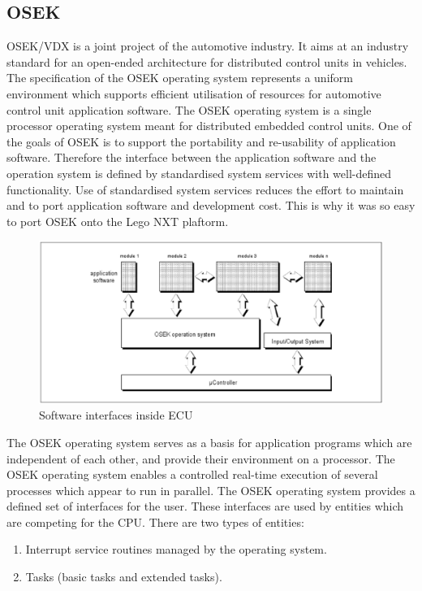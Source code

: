 \subsection{OSEK}

OSEK/VDX is a joint project of the automotive industry. It aims at an industry standard for an
open-ended architecture for distributed control units in vehicles.
The specification of the OSEK operating system represents a uniform environment which
supports efficient utilisation of resources for automotive control unit application software. The
OSEK operating system is a single processor operating system meant for distributed
embedded control units.
One of the goals of OSEK is to support the portability and re-usability of application software.
Therefore the interface between the application software and the operation system is defined
by standardised system services with well-defined functionality. Use of standardised system
services reduces the effort to maintain and to port application software and development cost.
This is why it was so easy to port OSEK onto the Lego NXT plaftorm.
\begin{figure}[htbp]
\begin{center}
\includegraphics[scale=0.4]{figures/nxtosek/osek1.eps}
\caption{Software interfaces inside ECU}
\end{center}
\end{figure}
The OSEK operating system serves as a basis for application programs which are independent
of each other, and provide their environment on a processor. The OSEK operating system
enables a controlled real-time execution of several processes which appear to run in parallel.
The OSEK operating system provides a defined set of interfaces for the user. These interfaces
are used by entities which are competing for the CPU. There are two types of entities:
\begin{enumerate}
\item Interrupt service routines managed by the operating system.
\item Tasks (basic tasks and extended tasks).
\end{enumerate}

